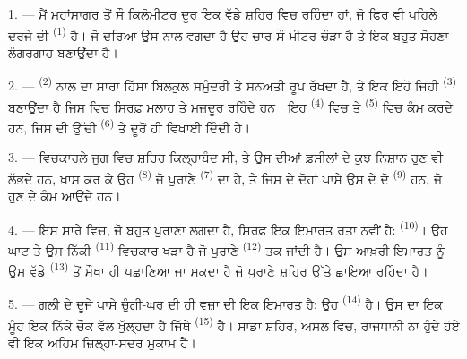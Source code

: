 
\VUsaut{2.0mm}
\VUsaut{3.0mm}
\VUfilet{16mm}
\VUsaut{5.6mm}
\VUsaut{1.4mm}
\VUsaut{2.2mm}

\VUsaut{3.0mm}

1. --- ਮੈਂ ਮਹਾਂਸਾਗਰ ਤੋਂ ਸੌ ਕਿਲੋਮੀਟਰ ਦੂਰ ਇਕ ਵੱਡੇ ਸ਼ਹਿਰ ਵਿਚ ਰਹਿੰਦਾ ਹਾਂ, ਜੋ ਫਿਰ ਵੀ
ਪਹਿਲੇ ਦਰਜੇ ਦੀ  \textsuperscript{(1)} ਹੈ। ਜੋ ਦਰਿਆ ਉਸ ਨਾਲ ਵਗਦਾ ਹੈ
ਉਹ ਚਾਰ ਸੌ ਮੀਟਰ ਚੌੜਾ ਹੈ ਤੇ ਇਕ ਬਹੁਤ ਸੋਹਣਾ ਲੰਗਰਗਾਹ ਬਣਾਉਂਦਾ ਹੈ।

2. ---  \textsuperscript{(2)} ਨਾਲ ਦਾ ਸਾਰਾ ਹਿੱਸਾ ਬਿਲਕੁਲ ਸਮੁੰਦਰੀ ਤੇ
ਸਨਅਤੀ ਰੂਪ ਰੱਖਦਾ ਹੈ, ਤੇ ਇਕ ਇਹੋ ਜਿਹੀ  \textsuperscript{(3)}
ਬਣਾਉਂਦਾ ਹੈ ਜਿਸ ਵਿਚ ਸਿਰਫ਼ ਮਲਾਹ ਤੇ ਮਜ਼ਦੂਰ ਰਹਿੰਦੇ ਹਨ। ਇਹ 
\textsuperscript{(4)} ਵਿਚ ਤੇ  \textsuperscript{(5)} ਵਿਚ ਕੰਮ ਕਰਦੇ ਹਨ,
ਜਿਸ ਦੀ ਉੱਚੀ  \textsuperscript{(6)} ਤੇ  ਦੂਰੋਂ ਹੀ
ਵਿਖਾਈ ਦਿੰਦੀ ਹੈ।

3. --- ਵਿਚਕਾਰਲੇ ਜੁਗ ਵਿਚ ਸ਼ਹਿਰ ਕਿਲ੍ਹਾਬੰਦ ਸੀ, ਤੇ ਉਸ ਦੀਆਂ ਫ਼ਸੀਲਾਂ ਦੇ ਕੁਝ ਨਿਸ਼ਾਨ ਹੁਣ
ਵੀ ਲੱਭਦੇ ਹਨ, ਖ਼ਾਸ ਕਰ ਕੇ ਉਹ  \textsuperscript{(8)} ਜੋ ਪੁਰਾਣੇ
 \textsuperscript{(7)} ਦਾ ਹੈ, ਤੇ ਜਿਸ ਦੇ ਦੋਹਾਂ ਪਾਸੇ ਉਸ ਦੇ ਦੋ
 \textsuperscript{(9)} ਹਨ, ਜੋ ਹੁਣ  ਦੇ ਕੰਮ ਆਉਂਦੇ ਹਨ।

4. --- ਇਸ ਸਾਰੇ  ਵਿਚ, ਜੋ ਬਹੁਤ ਪੁਰਾਣਾ ਲਗਦਾ ਹੈ, ਸਿਰਫ਼ ਇਕ ਇਮਾਰਤ ਰਤਾ
ਨਵੀਂ ਹੈ:  \textsuperscript{(10)}। ਉਹ ਘਾਟ ਤੇ ਉਸ ਨਿੱਕੀ
 \textsuperscript{(11)} ਵਿਚਕਾਰ ਖੜਾ ਹੈ ਜੋ ਪੁਰਾਣੇ 
\textsuperscript{(12)} ਤਕ ਜਾਂਦੀ ਹੈ। ਉਸ ਆਖ਼ਰੀ ਇਮਾਰਤ ਨੂੰ ਉਸ ਵੱਡੇ
 \textsuperscript{(13)} ਤੋਂ ਸੌਖਾ ਹੀ ਪਛਾਣਿਆ ਜਾ ਸਕਦਾ ਹੈ ਜੋ ਪੁਰਾਣੇ
ਸ਼ਹਿਰ ਉੱਤੇ ਛਾਇਆ ਰਹਿੰਦਾ ਹੈ।

5. --- ਗਲੀ ਦੇ ਦੂਜੇ ਪਾਸੇ ਚੁੰਗੀ-ਘਰ ਦੀ ਹੀ ਵਜ਼ਾ ਦੀ ਇਕ ਇਮਾਰਤ  ਹੈ: ਉਹ
 \textsuperscript{(14)} ਹੈ। ਉਸ ਦਾ ਇਕ ਮੂੰਹ ਇਕ ਨਿੱਕੇ ਚੌਕ ਵੱਲ
ਖੁੱਲ੍ਹਦਾ ਹੈ ਜਿੱਥੇ  \textsuperscript{(15)} ਹੈ। ਸਾਡਾ ਸ਼ਹਿਰ, ਅਸਲ
ਵਿਚ, ਰਾਜਧਾਨੀ ਨਾ ਹੁੰਦੇ ਹੋਏ ਵੀ ਇਕ ਅਹਿਮ ਜ਼ਿਲ੍ਹਾ-ਸਦਰ ਮੁਕਾਮ ਹੈ।

